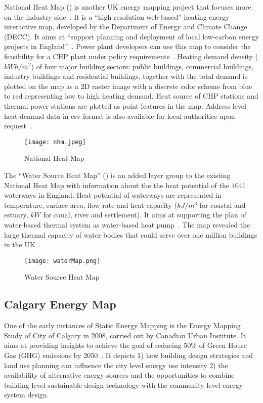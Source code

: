 National Heat Map () is another UK energy mapping
project that focuses more on the industry
side~\cite{decentralHeatMap2011}. It is a ``high resolution
web-based'' heating energy interactive map, developed by the
Department of Energy and Climate Change (DECC). It aims at ``support
planning and deployment of local low-carbon energy projects in
England''~\cite{heatMap2015}. Power plant developers can use this map
to consider the feasibility for a CHP plant under policy
requirements~\cite{decentralHeatMap2011}. Heating demand density
($kWh/m^2$) of four major building sectors: public buildings,
commercial buildings, industry buildings and residential buildings,
together with the total demand is plotted on the map as a 2D raster
image with a discrete color scheme from blue to red representing low
to high heating demand. Heat source of CHP stations and thermal power
stations are plotted as point features in the map. Address level heat
demand data in csv format is also available for local authorities upon
request~\cite{heatMapLocal2012}.

\begin{figure}[h!]
  \centering
  \texttt{[image: nhm.jpeg]}
  \caption[National Heat Map]{National Heat Map~\cite{heatMap2012}}
  \label{fig:nhm}
\end{figure}

The ``Water Source Heat Map'' () is an added layer
group to the existing National Heat Map with information about the the
heat potential of the 4041 waterways in England. Heat potential of
waterways are represented in temperature, surface area, flow rate and
heat capacity ($kJ/m^3$ for coastal and estuary, $kW$ for canal, river
and settlement). It aims at supporting the plan of water-based thermal
system as water-based heat pump~\cite{waterHeatMap}. The map revealed
the large thermal capacity of water bodies that could serve over one
million buildings in the UK~\cite{waterHeatMap}.

\begin{figure}[h!]
  \centering
  \texttt{[image: waterMap.png]}
  \caption[Water Heat Map]{Water Source Heat Map~\cite{waterHeatMap}}
  \label{fig:waterMap}
\end{figure}


\subsection{Calgary Energy Map}
One of the early instances of Static Energy Mapping is the Energy
Mapping Study of City of Calgary in 2008, carried out by Canadian
Urban Institute. It aims at providing insights to achieve the goal of
reducing 50\% of Green House Gas (GHG) emissions by
2050~\cite{aacip2009}. It depicts 1) how building design strategies
and land use planning can influence the city level energy use
intensity 2) the availability of alternative energy sources and the
opportunities to combine building level sustainable design technology
with the community level energy system design.

